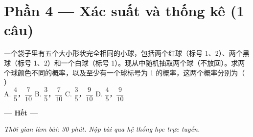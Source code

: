 \documentclass[11pt, a4paper]{article}
\begin{document}
\section*{Phần 4 — Xác suất và thống kê (1 câu)}

\begin{baitap}[20]
一个袋子里有五个大小形状完全相同的小球，包括两个红球（标号 1、2）、两个黑球（标号 1、2）和一个白球（标号 1）。现从中随机抽取两个球（不放回）。求两个球颜色不同的概率，以及至少有一个球标号为 1 的概率，这两个概率分别为（ ）\\[4pt]
A. $\dfrac{4}{5}$，$\dfrac{7}{10}$ \quad B. $\dfrac{3}{5}$，$\dfrac{7}{10}$ \quad C. $\dfrac{3}{5}$，$\dfrac{9}{10}$ \quad D. $\dfrac{4}{5}$，$\dfrac{9}{10}$
\end{baitap}

\vspace{0.5cm}
\begin{center}
\textbf{--- Hết ---}
\end{center}

\vspace{0.3cm}
\noindent\emph{Thời gian làm bài: 30 phút. Nộp bài qua hệ thống học trực tuyến.}
\end{document}
